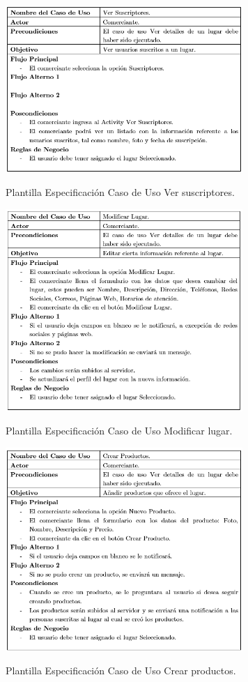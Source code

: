 \documentclass[12pt,letterpaper,openany]{book}
\begin{document}
\begin{table}[H]
\centering
\includegraphics[width=9cm]{./imagenes/PCU/ver_suscriptores}
\caption{Plantilla Especificación Caso de Uso Ver suscriptores.}
\end{table}

\begin{table}[H]
\centering
\includegraphics[width=9cm]{./imagenes/PCU/modificar_lugar}
\caption{Plantilla Especificación Caso de Uso Modificar lugar.}
\end{table}

\begin{table}[H]
\centering
\includegraphics[width=9cm]{./imagenes/PCU/crear_productos}
\caption{Plantilla Especificación Caso de Uso Crear productos.}
\end{table}
\end{document}
